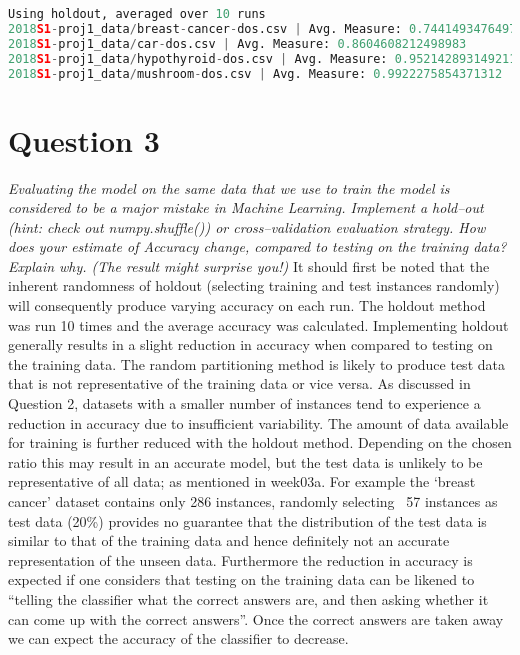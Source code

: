 \documentclass[a4paper]{article}
\begin{document}
\begin{lstlisting}[language=Python]
Using holdout, averaged over 10 runs
2018S1-proj1_data/breast-cancer-dos.csv | Avg. Measure: 0.7441493476497205
2018S1-proj1_data/car-dos.csv | Avg. Measure: 0.8604608212498983
2018S1-proj1_data/hypothyroid-dos.csv | Avg. Measure: 0.9521428931492114
2018S1-proj1_data/mushroom-dos.csv | Avg. Measure: 0.9922275854371312
\end{lstlisting}

\newpage
\section*{Question 3}
\textit{Evaluating the model on the same data that we use to train the model is considered to be a major mistake in Machine Learning. Implement a hold–out (hint: check out numpy.shuffle()) or cross–validation evaluation strategy. How does your estimate of Accuracy change, compared to testing on the training data? Explain why. (The result might surprise you!)}
\newline
\newline
It should first be noted that the inherent randomness of holdout (selecting training and test instances randomly) will consequently produce varying accuracy on each run. The holdout method was run 10 times and the average accuracy was calculated. Implementing holdout generally results in a slight reduction in accuracy when compared to testing on the training data. The random partitioning method is likely to produce test data that is not representative of the training data or vice versa.
\newline
\newline
As discussed in Question 2, datasets with a smaller number of instances tend to experience a reduction in accuracy due to insufficient variability. The amount of data available for training is further reduced with the holdout method. Depending on the chosen ratio this may result in an accurate model, but the test data is unlikely to be representative of all data; as mentioned in week03a. For example the ‘breast cancer’ dataset contains only 286 instances, randomly selecting ~57 instances as test data (20\%) provides no guarantee that the distribution of the test data is similar to that of the training data and hence definitely not an accurate representation of the unseen data.
\newline
\newline
Furthermore the reduction in accuracy is expected if one considers that testing on the training data can be likened to “telling the classifier what the correct answers are, and then asking whether it can come up with the correct answers”. Once the correct answers are taken away we can expect the accuracy of the classifier to decrease.
\end{document}
